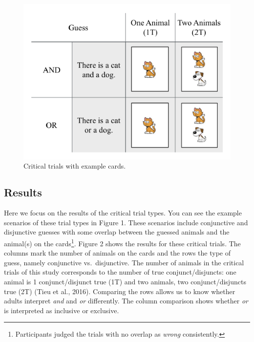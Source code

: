 \documentclass[10pt, letterpaper]{article}
\newenvironment{CodeChunk}{}{}
\begin{document}
\begin{CodeChunk}
\captionsetup{width=0.8\columnwidth}\begin{figure}[t]

{\centering \includegraphics{figs/critical-1} 

}

\caption[Critical trials with example cards]{Critical trials with example cards.}\label{fig:critical}
\end{figure}
\end{CodeChunk}

\subsection{Results}\label{results}

Here we focus on the results of the critical trial types. You can see
the example scenarios of these trial types in Figure 1. These scenarios
include conjunctive and disjunctive guesses with some overlap between
the guessed animals and the animal(s) on the
cards\footnote{Participants judged the trials with no overlap as \textit{wrong} consistently.}.
Figure 2 shows the results for these critical trials. The columns mark
the number of animals on the cards and the rows the type of guess,
namely conjunctive vs.~disjunctive. The number of animals in the
critical trials of this study corresponds to the number of true
conjunct/disjuncts: one animal is 1 conjunct/disjunct true (1T) and two
animals, two conjunct/disjuncts true (2T) (Tieu et al., 2016). Comparing
the rows allows us to know whether adults interpret \emph{and} and
\emph{or} differently. The column comparison shows whether \emph{or} is
interpreted as inclusive or exclusive.
\end{document}
